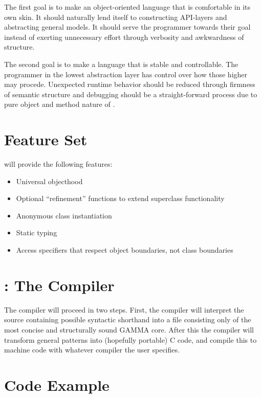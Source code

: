 The first goal is to make an object-oriented language that is comfortable
in its own skin. It should naturally lend itself to constructing API-layers
and abstracting general models. It should serve the programmer towards their
goal instead of exerting unnecessary effort through verbosity and awkwardness
of structure.


The second goal is to make a language that is stable and controllable.
The programmer in the lowest abstraction layer has control over how those
higher may procede. Unexpected runtime behavior should be reduced through
firmness of semantic structure and debugging should be a straight-forward
process due to pure object and method nature of \Lang{}.

\section*{\Lang{} Feature Set}

\Lang{} will provide the following features:

\begin{itemize}
\item Universal objecthood
\item Optional ``refinement'' functions to extend superclass functionality
\item Anonymous class instantiation
\item Static typing
\item Access specifiers that respect object boundaries, not class boundaries
\end{itemize}

\section*{\Compiler{}: The \Lang{} Compiler}

The compiler will proceed in two steps. First, the compiler will interpret
the source containing possible syntactic shorthand into a file
consisting only of the most concise and structurally sound GAMMA core. After this the compiler will transform
general patterns into (hopefully portable) C code, and compile this to
machine code with whatever compiler the user specifies.

\section*{Code Example}

